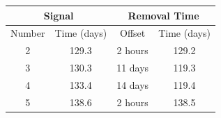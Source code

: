 \begin{tabular}{|cc|cc|}
\hline
\multicolumn{2}{|c|}{Signal} & \multicolumn{2}{c|}{Removal Time} \\
\hline
Number & Time (days) & Offset & Time (days) \\
\hline
2 & 129.3 & 2 hours & 129.2 \\
3 & 130.3 & 11 days & 119.3 \\
4 & 133.4 & 14 days & 119.4 \\
5 & 138.6 & 2 hours & 138.5 \\
\hline
\end{tabular}
